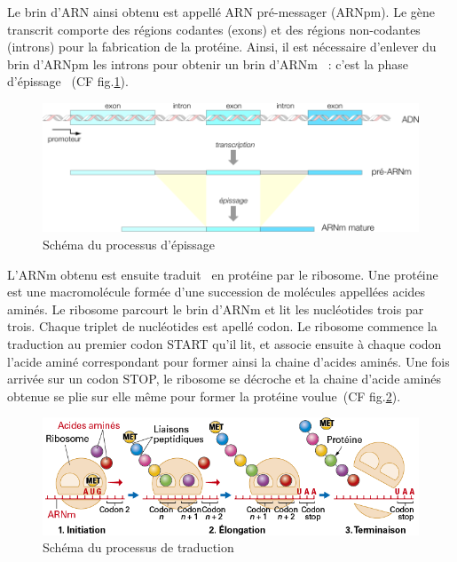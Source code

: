 \documentclass[12pt]{article}
\begin{document}
Le brin d'ARN ainsi obtenu est appellé ARN pré-messager (ARNpm). Le gène transcrit comporte des régions codantes (exons) et des régions non-codantes (introns) pour la fabrication de la protéine. Ainsi, il est nécessaire d'enlever du brin d'ARNpm les introns pour obtenir un brin d'ARNm~\cite{arnm} : c'est la phase d'épissage~\nocite{epissage} (CF fig.\ref{epissage}).\\

\begin{figure}[!h]
    \centering
    \includegraphics[scale = 1.1]{Images/Intro/epissage.png}
    \caption{Schéma du processus d'épissage}
    \label{epissage}
\end{figure}

\newpage

L'ARNm obtenu est ensuite traduit~\cite{rnat} en protéine par le ribosome. Une protéine est une macromolécule formée d'une succession de molécules appellées acides aminés. Le ribosome parcourt le brin d'ARNm et lit les nucléotides trois par trois. Chaque triplet de nucléotides est apellé codon. Le ribosome commence la traduction au premier codon START qu'il lit, et associe ensuite à chaque codon l'acide aminé correspondant pour former ainsi la chaine d'acides aminés. Une fois arrivée sur un codon STOP, le ribosome se décroche et la chaine d'acide aminés obtenue se plie sur elle même pour former la protéine voulue~(CF fig.\ref{traduction})\nocite{traduction}.\\

\begin{figure}[h!]
    \centering
    \includegraphics[scale = 1.4]{Images/Intro/Trad.png}
    \caption{Schéma du processus de traduction}
    \label{traduction}
\end{figure}
\end{document}
